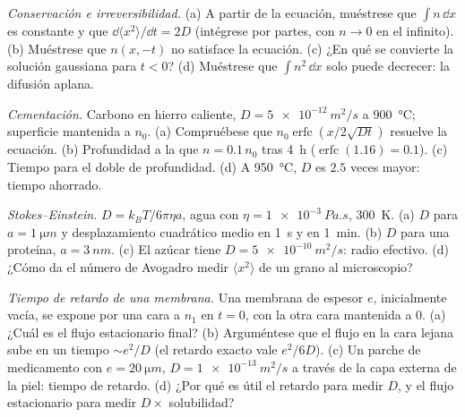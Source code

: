 \begin{exercise}[$\star\star$]\label{exo:b2:particle-diffusion:7}
\emph{Conservación e irreversibilidad.} (a) A partir de la ecuación, muéstrese
que $\int n\,\dd x$ es constante y que $\dd\langle x^2\rangle/\dd t =
2D$ (intégrese por partes, con $n \to 0$ en el infinito). (b) Muéstrese que
$n(x,-t)$ no satisface la ecuación. (c) ¿En qué se convierte la
solución gaussiana para $t < 0$? (d) Muéstrese que $\int n^2\,\dd x$ solo puede
decrecer: la difusión aplana.
\end{exercise}

\begin{exercise}[$\star\star$]\label{exo:b2:particle-diffusion:8}
\emph{Cementación.} Carbono en hierro caliente, $D = \qty{5e-12}{m^2/s}$ a
\qty{900}{\celsius}; superficie mantenida a $n_0$. (a) Compruébese que $n_0
\operatorname{erfc}(x/2\sqrt{Dt})$ resuelve la ecuación. (b) Profundidad a la
que $n = 0.1\,n_0$ tras \qty{4}{h} ($\operatorname{erfc}(1.16) = 0.1$).
(c) Tiempo para el doble de profundidad. (d) A \qty{950}{\celsius}, $D$ es $2.5$
veces mayor: tiempo ahorrado.
\end{exercise}

\begin{exercise}[$\star\star$]\label{exo:b2:particle-diffusion:9}
\emph{Stokes--Einstein.} $D = k_BT/6\pi\eta a$, agua con $\eta =
\qty{1e-3}{Pa.s}$, \qty{300}{K}. (a) $D$ para $a = \qty{1}{\micro m}$ y
desplazamiento cuadrático medio en \qty{1}{s} y en \qty{1}{min}. (b) $D$
para una proteína, $a = \qty{3}{nm}$. (c) El azúcar tiene $D = \qty{5e-10}{m^2/s}$:
radio efectivo. (d) ¿Cómo da el número de Avogadro medir $\langle x^2\rangle$ de un grano
al microscopio?
\end{exercise}

\begin{exercise}[$\star\star\star$]\label{exo:b2:particle-diffusion:10}
\emph{Tiempo de retardo de una membrana.} Una membrana de espesor $e$, inicialmente
vacía, se expone por una cara a $n_1$ en $t = 0$, con la otra cara mantenida
a $0$. (a) ¿Cuál es el flujo estacionario final? (b) Arguméntese que el flujo
en la cara lejana sube en un tiempo $\sim e^2/D$ (el retardo exacto vale
$e^2/6D$). (c) Un parche de medicamento con $e = \qty{20}{\micro m}$, $D =
\qty{1e-13}{m^2/s}$ a través de la capa externa de la piel: tiempo de retardo. (d) ¿Por qué
es útil el retardo para medir $D$, y el flujo estacionario para medir
$D \times$ solubilidad?
\end{exercise}

